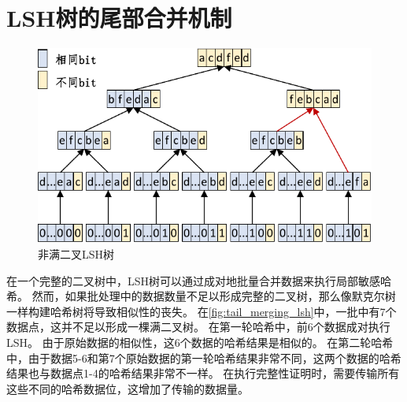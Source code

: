 \section{LSH树的尾部合并机制}

\begin{figure}[t]
    \centering
	\begin{minipage}{0.8\linewidth}
        \centering
        \includegraphics[width=1\textwidth]{figures/timechain/tail_merging_lsh.pdf}
        \caption{非满二叉LSH树}
        \label{fig:tail_merging_lsh}
	\end{minipage}
\end{figure}

在一个完整的二叉树中，LSH树可以通过成对地批量合并数据来执行局部敏感哈希。
然而，如果批处理中的数据数量不足以形成完整的二叉树，那么像默克尔树一样构建哈希树将导致相似性的丧失。
在\autoref{fig:tail_merging_lsh}中，一批中有7个数据点，这并不足以形成一棵满二叉树。
在第一轮哈希中，前6个数据成对执行LSH。
由于原始数据的相似性，这6个数据的哈希结果是相似的。
在第二轮哈希中，由于数据5-6和第7个原始数据的第一轮哈希结果非常不同，这两个数据的哈希结果也与数据点1-4的哈希结果非常不一样。
在执行完整性证明时，需要传输所有这些不同的哈希数据位，这增加了传输的数据量。

